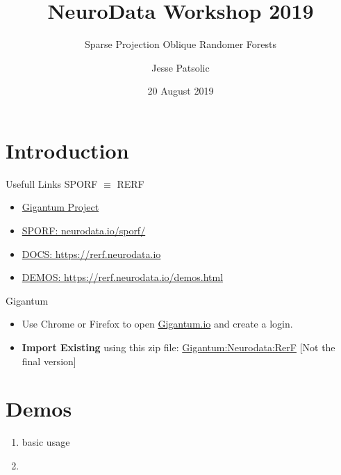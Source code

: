 \documentclass[xcolor=dvipsnames]{beamer}
\title[NDWS-2019]{NeuroData Workshop 2019}
\subtitle[SPORF]{Sparse Projection Oblique Randomer Forests}
\author[JLP]{Jesse Patsolic}
\institute[JHU]{Johns Hopkins University}%
\date[20190820]{20 August 2019}
\begin{document}
\begin{frame}
\titlepage
\end{frame}



\section{Introduction}

\begin{frame}{Usefull Links}
    SPORF $\equiv$ RERF
    \begin{itemize}
        \item \href{https://gigantum.com/neurodata/rerf}{Gigantum Project}
        \item \href{https://neurodata.io/sporf/}{SPORF: neurodata.io/sporf/}
        \item \href{https://rerf.neurodata.io}{DOCS: https://rerf.neurodata.io}
        \item \href{https://rerf.neurodata.io/demos.html}{DEMOS: https://rerf.neurodata.io/demos.html}
    \end{itemize}
\end{frame}

\begin{frame}{Gigantum}
    \begin{itemize}
        \item Use Chrome or Firefox to open \href{https://rerf.gigantumdemo.com}{Gigantum.io} and create a login.
        \item \textbf{Import Existing} using this zip file:
            \href{http://cis.jhu.edu/~jesse/gigantum/rerf-9f82cd.zip}{Gigantum:Neurodata:RerF}
            [Not the final version]
    \end{itemize}
\end{frame}


\section{Demos}

\begin{frame}{}
    \begin{enumerate}
        \item basic usage
        \item 
    \end{enumerate}
\end{frame}
\end{document}
